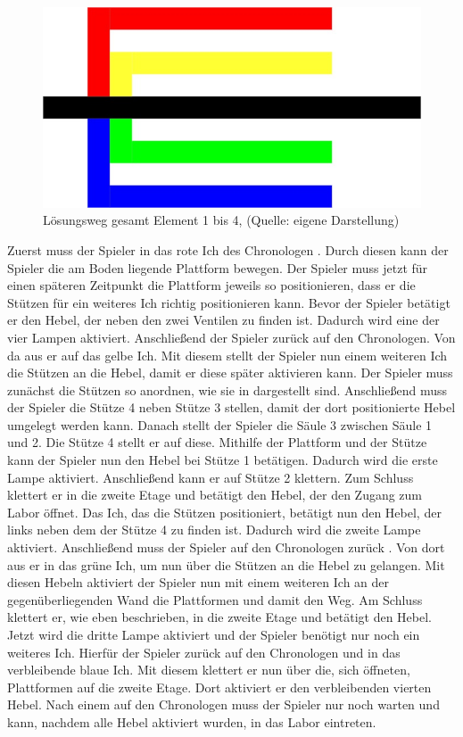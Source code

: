 \begin{figure}[ht]
\centering
\includegraphics[width=0.6\linewidth]{content/pictures/Raetsel-L02_R02_E01_4_V01_Loesung}
\caption{Lösungsweg gesamt Element 1 bis 4, (Quelle: eigene Darstellung)}
\label{fig:L02_R02_E01_4_V01}
\end{figure}
\newpage
Zuerst muss der Spieler in das rote Ich des Chronologen . Durch diesen kann der Spieler die am Boden liegende Plattform bewegen. Der Spieler muss jetzt für einen späteren Zeitpunkt die Plattform jeweils so positionieren, dass er die Stützen für ein weiteres Ich richtig positionieren kann. Bevor der Spieler  betätigt er den Hebel, der neben den zwei Ventilen zu finden ist. Dadurch wird eine der vier Lampen aktiviert. Anschließend  der Spieler zurück auf den Chronologen. Von da aus  er auf das gelbe Ich. Mit diesem stellt der Spieler nun einem weiteren Ich die Stützen an die Hebel, damit er diese später aktivieren kann. Der Spieler muss zunächst die Stützen so anordnen, wie sie in  dargestellt sind. Anschließend muss der Spieler die Stütze 4 neben Stütze 3 stellen, damit der dort positionierte Hebel umgelegt werden kann. Danach stellt der Spieler die Säule 3 zwischen Säule 1 und 2. Die Stütze 4 stellt er auf diese. Mithilfe der Plattform und der Stütze kann der Spieler nun den Hebel bei Stütze 1 betätigen. Dadurch wird die erste Lampe aktiviert. Anschließend kann er auf Stütze 2 klettern. Zum Schluss klettert er in die zweite Etage und betätigt den Hebel, der den Zugang zum Labor öffnet. Das Ich, das die Stützen positioniert, betätigt nun den Hebel, der links neben dem der Stütze 4 zu finden ist. Dadurch wird die zweite Lampe aktiviert.
Anschließend muss der Spieler auf den Chronologen zurück . Von dort aus  er in das grüne Ich, um nun über die Stützen an die Hebel zu gelangen. Mit diesen Hebeln aktiviert der Spieler nun mit einem weiteren Ich an der gegenüberliegenden Wand die Plattformen und damit den Weg. Am Schluss klettert er, wie eben beschrieben, in die zweite Etage und betätigt den Hebel. Jetzt wird die dritte Lampe aktiviert und der Spieler benötigt nur noch ein weiteres Ich.
Hierfür  der Spieler zurück auf den Chronologen und  in das verbleibende blaue Ich. Mit diesem klettert er nun über die, sich öffneten, Plattformen auf die zweite Etage. Dort aktiviert er den verbleibenden vierten Hebel. Nach einem  auf den Chronologen muss der Spieler nur noch warten und kann, nachdem alle Hebel aktiviert wurden, in das Labor eintreten.


